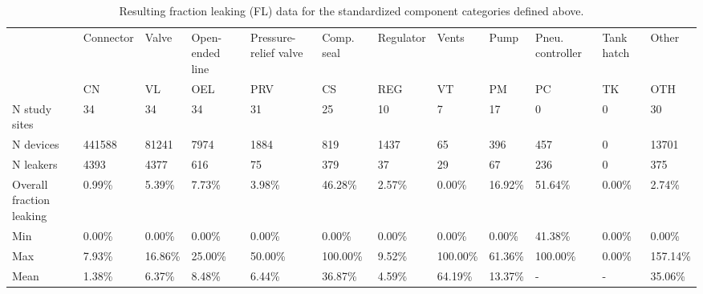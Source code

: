\documentclass[11pt]{report}
\begin{document}
{{{{\begin{landscape}
\begin{table}
\begin{scriptsize}
\caption{Resulting fraction leaking (FL) data for the standardized component categories defined above.}
\label{tab:fraction_leaking_results}
\begin{tabular*}{1\columnwidth}{p{}p{}p{}p{}p{}p{}p{}p{}p{}p{}p{}p{}}
\toprule
			& Connector               & Valve  & Open-ended line & Pressure-relief valve & Comp. seal & Regulator & Vents  & Pump     & Pneu. controller & Tank hatch & Other           \\
                         & CN     & VL              & OEL                   & PRV             & CS        & REG    & VT       & PM                            & PC              & TK                  & OTH      \\
                         \midrule
N study sites            & 34     & 34              & 34                    & 31              & 25        & 10     & 7        & 17                            & 0               & 0                   & 30       \\
N devices                & 441588 & 81241           & 7974                  & 1884            & 819       & 1437   & 65       & 396                           & 457             & 0                   & 13701    \\
N leakers                & 4393   & 4377            & 616                   & 75              & 379       & 37     & 29       & 67                            & 236             & 0                   & 375      \\
Overall fraction leaking & 0.99\% & 5.39\%          & 7.73\%                & 3.98\%          & 46.28\%   & 2.57\% & 0.00\%   & 16.92\%                       & 51.64\%         & 0.00\%              & 2.74\%   \\
\midrule
Min                      & 0.00\% & 0.00\%          & 0.00\%                & 0.00\%          & 0.00\%    & 0.00\% & 0.00\%   & 0.00\%                        & 41.38\%         & 0.00\%              & 0.00\%   \\
Max                      & 7.93\% & 16.86\%         & 25.00\%               & 50.00\%         & 100.00\%  & 9.52\% & 100.00\% & 61.36\%                       & 100.00\%        & 0.00\%              & 157.14\% \\
Mean                     & 1.38\% & 6.37\%          & 8.48\%                & 6.44\%          & 36.87\%   & 4.59\% & 64.19\%  & 13.37\%                       & -               & -                   & 35.06\%  \\

\end{tabular*}
\end{scriptsize}
\end{table}
\end{landscape}}}}}
\end{document}
